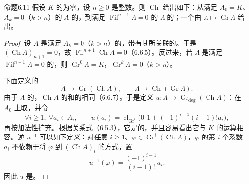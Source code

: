\begin{SGAresult}{命题}{6.11}
假设 $K$ 的为零，设 $n\geqslant0$ 是整数。则 $\operatorname{Ch}$ 给出如下：从满足 $A_0=K$、$A_k=0$（$k>n$）的 $A$ 的，到满足 $\operatorname{Fil}^{n+1}\Lambda=0$ 的 $\Lambda$ 的；一个由 $\Lambda\longmapsto\operatorname{Gr}\Lambda$ 给出。
\end{SGAresult}
\begin{proof}
设 $A$ 是满足 $A_k=0$（$k>n$）的，带有其所关联的。于是 $(\operatorname{Ch}A)_{n+1}=0$，故 $\operatorname{Fil}^{n+1}\operatorname{Ch}A=0$（6.6.5）。反过来，若 $\Lambda$ 是满足 $\operatorname{Fil}^{n+1}\Lambda=0$ 的，则 $\operatorname{Gr}^0\Lambda=K$，$\operatorname{Gr}^k\Lambda=0$（$k>n$）。

下面定义的
\[
A\longrightarrow\operatorname{Gr}(\operatorname{Ch}A),
\qquad
\Lambda\longrightarrow\operatorname{Ch}(\operatorname{Gr}\Lambda).
\]
由于 $A$ 的，$\operatorname{Ch}A$ 的和的相同（6.6.7）。于是定义
$u:A\longrightarrow\operatorname{Gr}_{\deg}(\operatorname{Ch}A)$：在 $A_0$ 上取，并令
\[
\forall i\geqslant1,\ \forall a_i\in A_i,\qquad
u(a_i)=\operatorname{cl}_{\operatorname{Gr}^i}
 \bigl(0,1+(-1)^{i-1}(i-1)!a_i\bigr),
\]
再按加法性扩充。根据关系式（6.5.3），它是的，并且容易看出它与 $K$ 的运算相容。逆 $u^{-1}$ 可以如下定义：对任意 $i\geqslant1$、$\bar\varphi\in\operatorname{Gr}^i(\operatorname{Ch}A)$，$\bar\varphi$ 的第 $i$ 个系数 $a_i$ 不依赖于将 $\bar\varphi$ 到 $(\operatorname{Ch}A)_i$ 的方式，置
\[
u^{-1}(\bar\varphi)=\frac{(-1)^{i-1}}{(i-1)!}a_i.
\]
因此 $u$ 是。


\end{proof}
